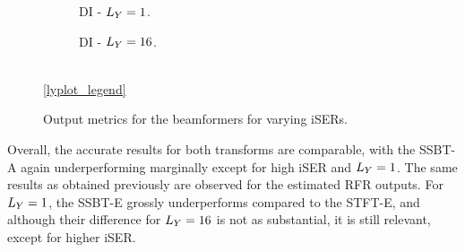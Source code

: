 \begin{figure}[!ht]
	\begin{subfigure}{0.49\textwidth}
		\centering
		
		\caption{DI - $\Ly = 1$.}
		\label{subfig:lineplot__DI__iSER_var__Ly_1}
	\end{subfigure}\hfill
	\begin{subfigure}{0.49\textwidth}
		\centering
		
		\caption{DI - $\Ly = 16$.}
		\label{subfig:lineplot__DI__iSER_var__Ly_16}
	\end{subfigure}\\[1em]
	\ref*{lyplot_legend}
	\caption{Output metrics for the beamformers for varying iSERs.}
	\label{fig:lineplot__iSER_var__Ly_1}
\end{figure}
Overall, the accurate results for both transforms are comparable, with the SSBT-A again underperforming marginally except for high iSER and $\Ly = 1$. The same results as obtained previously are observed for the estimated RFR outputs. For $\Ly = 1$, the SSBT-E grossly underperforms compared to the STFT-E, and although their difference for $\Ly = 16$ is not as substantial, it is still relevant, except for higher iSER.

